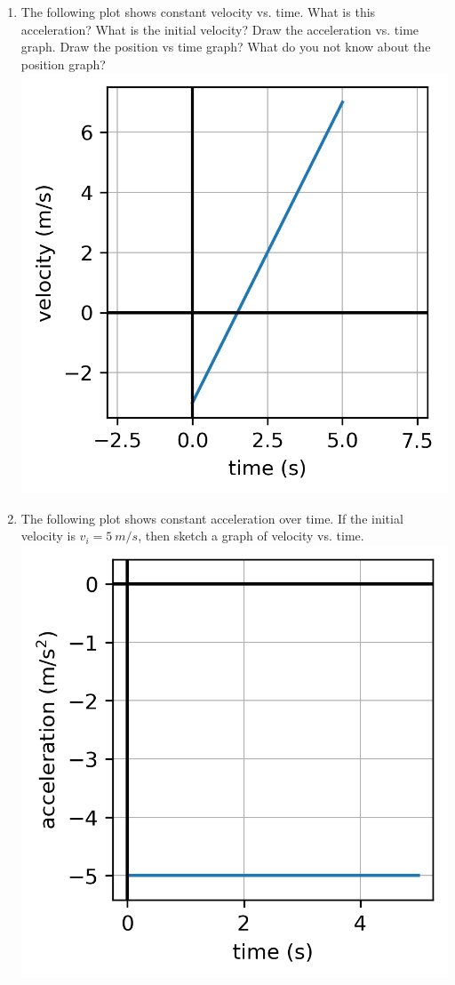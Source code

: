 \begin{enumerate}
\item The following plot shows constant velocity vs. time. What is this acceleration? What is the initial velocity? Draw the acceleration vs. time graph. Draw the position vs time graph? What do you not know about the position graph?\\
\includegraphics[]{week4-v1-t.png}

\item The following plot shows constant acceleration over time. If the initial velocity is $v_i=\SI{5}{m/s}$, then sketch a graph of velocity vs. time. \\
\includegraphics[]{week4-a1-t.png} 


\end{enumerate}
